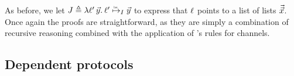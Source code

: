 \noindent
As before, we let $\interpvarB \eqdef \Lam \loc'\,\vec\varB. \listrefI \interpvar {\loc'} {\vec\varB}$
to express that $\ell$ points to a list of lists $\vec{\vec{x}}$.
Once again the proofs are straightforward, as they are simply a combination of
recursive reasoning combined with the application of \lname's rules for channels.

\delegationfig

\subsection{Dependent protocols}
\label{sec:dependent}

\newcommand{\dependentfig}{
\begin{figure}
\begin{equation*}
\begin{array}{@{}l@{\quad}l@{}}
\begin{array}[t]{@{}l@{}}
\listsortelemservicename\ \cmpvar\ \chan\ \eqdef\\
\quad \mbranchD \chan
  {\begin{array}[t]{@{}l@{}}
    \Let \var_1 = \recv\chan in\\
    \mbranchD{\chan}
    {\begin{array}[t]{@{} l @{}}
      \Let \var_2 = \recv \chan in \\
      \Let \chan_1 = \start{\listsortelemservicename\ \cmpvar} in \\
      \Let \chan_2 = \start{\listsortelemservicename\ \cmpvar} in \\
      \select {\chan_1} \leftname;\ \send {\chan_1} \var_1; \\
      \select {\chan_2} \leftname;\ \send {\chan_2} \var_2; \\
      \listsortelemservicesplitname\ \chan\ \chan_1\ \chan_2;\
      \listsortelemservicemergename\ \cmpvar\ \chan\ \chan_1\ \chan_2
     \end{array}}
    {\begin{array}[t]{@{} l @{}}
       \select \chan \leftname;\
       \send \chan \var_1; \\
       \select \chan \rightname
     \end{array}}
    \end{array}}
  {\select \chan \rightname} \\
~ \\[-0.7em]
\listsortelemservicesplitname\ \chan\ \chan_1\ \chan_2\ \eqdef\\
\quad \mbranchD \chan
  {\begin{array}[t]{@{}l@{}}

\end{array}}
\end{array}
\end{array}
\end{equation*}
\end{figure}}
